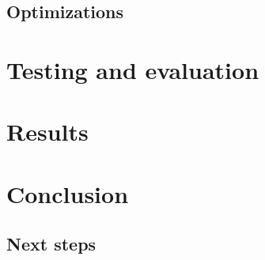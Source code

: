 \documentclass[a4paper]{article}
\begin{document}
\subsection{Optimizations}



\section{Testing and evaluation}

\section{Results}

\section{Conclusion}
\subsection{Next steps}
\end{document}
